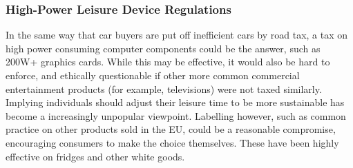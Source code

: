 \documentclass[conference]{IEEEtran}
\begin{document}
\subsubsection{High-Power Leisure Device Regulations}

In the same way that car buyers are put off inefficient cars by road
tax, a tax on high power consuming computer components could be the
answer, such as 200W+ graphics cards. While this may be effective, it
would also be hard to enforce, and ethically questionable if other
more common commercial entertainment products (for example,
televisions) were not taxed similarly. Implying individuals should
adjust their leisure time to be more sustainable has become a
increasingly unpopular viewpoint. Labelling however, such as common
practice on other products sold in the EU, could be a reasonable
compromise, encouraging consumers to make the choice themselves. These
have been highly effective on fridges and other white goods.







\end{document}
